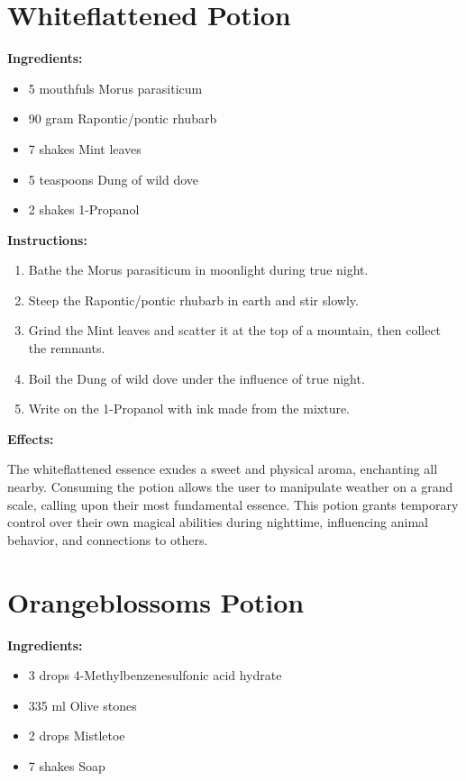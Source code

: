 \documentclass{article}
\begin{document}
\newpage
\section*{Whiteflattened Potion}

\textbf{Ingredients:}

\begin{itemize}
  \item 5 mouthfuls Morus parasiticum
  \item 90 gram Rapontic/pontic rhubarb
  \item 7 shakes Mint leaves
  \item 5 teaspoons Dung of wild dove
  \item 2 shakes 1-Propanol
\end{itemize}

\textbf{Instructions:}

\begin{enumerate}
  \item Bathe the Morus parasiticum in moonlight during true night.
  \item Steep the Rapontic/pontic rhubarb in earth and stir slowly.
  \item Grind the Mint leaves and scatter it at the top of a mountain, then collect the remnants.
  \item Boil the Dung of wild dove under the influence of true night.
  \item Write on the 1-Propanol with ink made from the mixture.
\end{enumerate}

\textbf{Effects:}

The whiteflattened essence exudes a sweet and physical aroma, enchanting all nearby. Consuming the potion allows the user to manipulate weather on a grand scale, calling upon their most fundamental essence. This potion grants temporary control over their own magical abilities during nighttime, influencing animal behavior, and connections to others.

\newpage
\section*{Orangeblossoms Potion}

\textbf{Ingredients:}

\begin{itemize}
  \item 3 drops 4-Methylbenzenesulfonic acid hydrate
  \item 335 ml Olive stones
  \item 2 drops Mistletoe
  \item 7 shakes Soap
\end{itemize}
\end{document}
